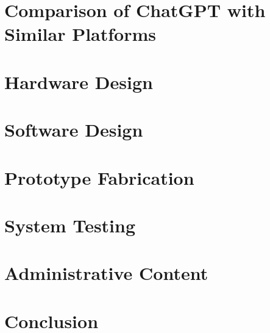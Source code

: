 \documentclass[12pt, letterpaper]{article}
\begin{document}
\begin{singlespace}
		\newpage
		\section{Comparison of ChatGPT with Similar Platforms}
		
		
		\newpage
		\section{Hardware Design}
		
		
		
		
		
		\newpage
		\section{Software Design}
		
		
		
		
		
		\newpage
		\section{Prototype Fabrication}
		
		
		\newpage
		\section{System Testing}
		
		
		\newpage
		\section{Administrative Content}
		
		
			
		\newpage
		\section{Conclusion}
		
		

\end{singlespace}
\end{document}
